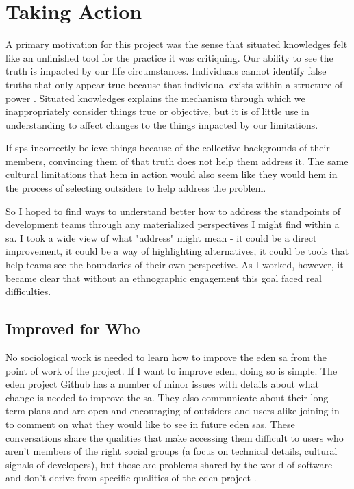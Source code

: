 \documentclass[a4paper,man,natbib,floatsintext]{apa6}
\begin{document}
  \section{Taking Action}
  A primary motivation for this project was the sense that situated knowledges felt like an unfinished tool for the practice it was critiquing. Our ability to see the truth is impacted by our life circumstances. Individuals cannot identify false truths that only appear true because that individual exists within a structure of power \citep{Haraway1988-nh}. Situated knowledges explains the mechanism through which we inappropriately consider things true or objective, but it is of little use in understanding to affect changes to the things impacted by our limitations. 

  If \glspl{sp} incorrectly believe things because of the collective backgrounds of their members, convincing them of that truth does not help them address it. The same cultural limitations that hem in action would also seem like they would hem in the process of selecting outsiders to help address the problem.

  So I hoped to find ways to understand better how to address the standpoints of development teams through any materialized perspectives I might find within a \gls{sa}. I took a wide view of what "address" might mean - it could be a direct improvement, it could be a way of highlighting alternatives, it could be tools that help teams see the boundaries of their own perspective. As I worked, however, it became clear that without an ethnographic engagement this goal faced real difficulties.

  \subsection{Improved for Who}
  No sociological work is needed to learn how to improve the \acrshort{eden} \gls{sa} from the point of work of the project. If I want to improve \acrshort{eden}, doing so is simple. The \acrshort{eden} project Github has a number of minor issues with details about what change is needed to improve the \gls{sa}. They also communicate about their long term plans and are open and encouraging of outsiders and users alike joining in to comment on what they would like to see in future \acrshort{eden} \glspl{sa}. These conversations share the qualities that make accessing them difficult to users who aren't members of the right social groups (a focus on technical details, cultural signals of developers), but those are problems shared by the world of software and don't derive from specific qualities of the \acrshort{eden} project \citep{Drexler2019-tk,Kelty2008-jm}.
\end{document}
